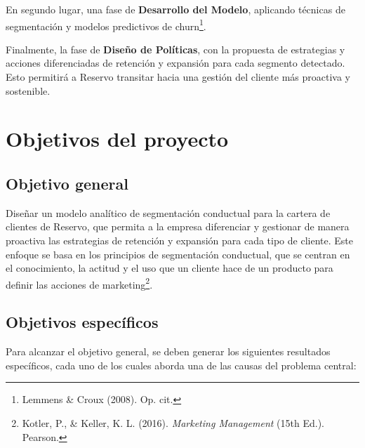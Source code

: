 En segundo lugar, una fase de \textbf{Desarrollo del Modelo}, aplicando técnicas de segmentación y modelos predictivos de churn\footnote{Lemmens \& Croux (2008). Op. cit.}.  

Finalmente, la fase de \textbf{Diseño de Políticas}, con la propuesta de estrategias y acciones diferenciadas de retención y expansión para cada segmento detectado. Esto permitirá a Reservo transitar hacia una gestión del cliente más proactiva y sostenible.


\section{Objetivos del proyecto}

\subsection{Objetivo general}

Diseñar un modelo analítico de segmentación conductual para la cartera de clientes de Reservo, que permita a la empresa diferenciar y gestionar de manera proactiva las estrategias de retención y expansión para cada tipo de cliente. Este enfoque se basa en los principios de segmentación conductual, que se centran en el conocimiento, la actitud y el uso que un cliente hace de un producto para definir las acciones de marketing\footnote{Kotler, P., \& Keller, K. L. (2016). \textit{Marketing Management} (15th Ed.). Pearson.}.

\subsection{Objetivos específicos}

Para alcanzar el objetivo general, se deben generar los siguientes resultados específicos, cada uno de los cuales aborda una de las causas del problema central:

